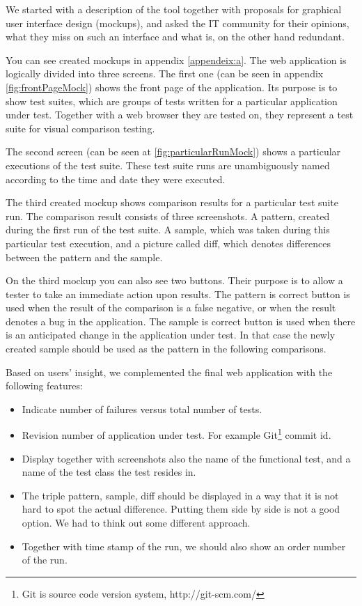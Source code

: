 \documentclass[11pt,oneside,final]{fithesis2}
\begin{document}
  We started with a description of the tool together with proposals for graphical user interface design (mockups), and asked the IT community for their
  opinions, what they miss on such an interface and what is, on the other hand redundant.
  
  You can see created mockups in appendix \ref{appendeix:a}. The web application is logically divided into
  three screens. The first one (can be seen in appendix \ref{fig:frontPageMock}) shows the front page of the application. Its purpose
  is to show test suites, which are groups of tests written for a particular application under test.
  Together with a web browser they are tested on, they represent a test suite for visual comparison testing.
  
  The second screen (can be seen at \ref{fig:particularRunMock}) shows a particular executions of the test suite. These test
  suite runs are unambiguously named according to the time and date they were executed.
  
  The third created mockup shows comparison results for a particular test suite run. The comparison result
  consists of three screenshots. A pattern, created during the first run of the test suite. A sample, which
  was taken during this particular test execution, and a picture called diff, which denotes differences
  between the pattern and the sample.
  
  On the third mockup you can also see two buttons. Their purpose is to allow a tester to take an immediate
  action upon results. The pattern is correct button is used when the result of the comparison is
  a false negative, or when the result denotes a bug in the application. The sample is correct button is used
  when there is an anticipated change in the application under test. 
  In that case the newly created sample should be used as the pattern in the following comparisons.
  
  Based on users' insight, we complemented the final web application with the following features:
  
  \begin{itemize}
   \item Indicate number of failures versus total number of tests.
   \item Revision number of application under test. For example Git\footnote{Git is source code version system, http://git-scm.com/}
   commit id.
   \item Display together with screenshots also the name of the functional test, and a name of the test class
   the test resides in.
   \item The triple pattern, sample, diff should be displayed in a way that it is not hard to spot the
   actual difference. Putting them side by side is not a good option. We had to think out some different
   approach.
   \item Together with time stamp of the run, we should also show an order number of the run.
  \end{itemize}
\end{document}
